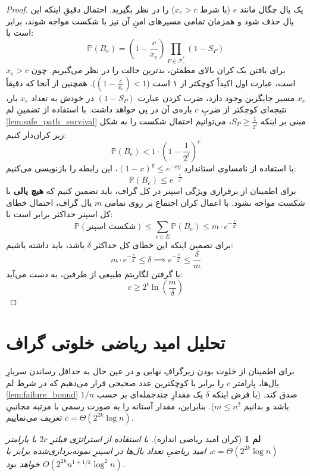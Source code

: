 \documentclass[11pt,a4paper]{report}
\theoremstyle{plain}
\newtheorem{lem}[thm]{\normalsize لم}
\theoremstyle{definition}
\theoremstyle{remark}
\begin{document}
\begin{proof}
یک یال چگال مانند $e$ (با شرط $x_e > c$) را در نظر بگیرید. احتمال دقیقِ اینکه این یال حذف شود و همزمان تمامی مسیرهای امنِ آن نیز با شکست مواجه شوند، برابر است با:
\[
\mathbb{P}(B_e) = \left( 1 - \frac{c}{x_e} \right) \prod_{P \in \mathcal{P}^*_e} (1 - S_P)
\]
برای یافتن یک کران بالای مطمئن، بدترین حالت را در نظر می‌گیریم. چون $x_e > c$ است، عبارت اول اکیداً کوچکتر از ۱ است ($\left( 1 - \frac{c}{x_e} \right) < 1$). همچنین از آنجا که دقیقاً $x_e$ مسیر جایگزین وجود دارد، ضرب کردن عبارت $(1 - S_P)$ در خودش به تعداد $x_e$ بار، نتیجه‌ای کوچکتر از ضربِ $c$ باره‌ی آن در پی خواهد داشت. با استفاده از تضمینِ لم \ref{lem:safe_path_survival} مبنی بر اینکه $S_P \ge \frac{1}{2^t}$، می‌توانیم احتمال شکست را به شکل زیر کران‌دار کنیم:
\[
\mathbb{P}(B_e) < 1 \cdot \left( 1 - \frac{1}{2^t} \right)^c
\]
با استفاده از نامساوی استاندارد $(1 - x)^y \le e^{-xy}$، این رابطه را بازنویسی می‌کنیم:
\[
\mathbb{P}(B_e) \le e^{-\frac{c}{2^t}}
\]
برای اطمینان از برقراری ویژگی اسپنر در کل گراف، باید تضمین کنیم که \textbf{هیچ یالی} با شکست مواجه نشود. با اعمال کران اجتماع بر روی تمامی $m$ یال گراف، احتمال خطای کل اسپنر حداکثر برابر است با:
\[
\mathbb{P}(\text{شکست اسپنر}) \le \sum_{e \in E} \mathbb{P}(B_e) \le m \cdot e^{-\frac{c}{2^t}}
\]
برای تضمین اینکه این خطای کل حداکثر $\delta$ باشد، باید داشته باشیم:
\[
m \cdot e^{-\frac{c}{2^t}} \le \delta \implies e^{-\frac{c}{2^t}} \le \frac{\delta}{m}
\]
با گرفتن لگاریتم طبیعی از طرفین، به دست می‌آید:
\[
c \ge 2^t \ln\left(\frac{m}{\delta}\right)
\]
\end{proof}

\section{تحلیل امید ریاضی خلوتی گراف}
برای اطمینان از خلوت بودن زیرگرافِ نهایی و در عین حال به حداقل رساندن سربارِ یال‌ها، پارامتر $c$ را برابر با کوچکترین عدد صحیحی قرار می‌دهیم که در شرط لم \ref{lem:failure_bound} صدق کند. (با فرض اینکه $\delta$ یک مقدارِ چندجمله‌ای بر حسب $1/n$ باشد و بدانیم $m \le n^2$). بنابراین، مقدار آستانه را به صورت رسمی با مرتبه مجانبیِ $c = \Theta(2^{2k} \log n)$ تعریف می‌نماییم.

\begin{lem}[کران امید ریاضی اندازه]\label{lem:expected_size}
با استفاده از استراتژی فیلترِ $2c$ با پارامتر $c = \Theta(2^{2k} \log n)$، امید ریاضیِ تعداد یال‌ها در اسپنرِ نمونه‌برداری‌شده برابر با $O(2^{2k} n^{1+1/k} \log^2 n)$ خواهد بود.
\end{lem}
\end{document}
